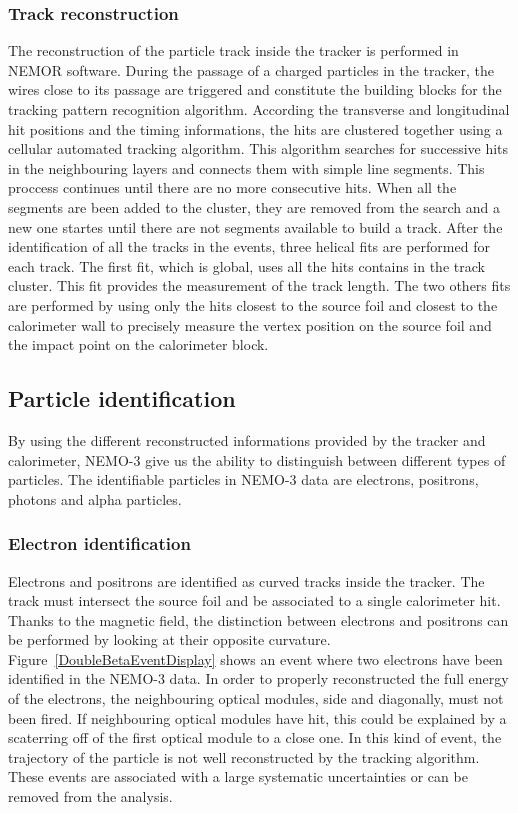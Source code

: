 \documentclass[main.tex]{subfiles}
\begin{document}
\subsubsection{Track reconstruction}


\NI The reconstruction of the particle track inside the tracker is performed in NEMOR software. During the passage of a charged particles in the tracker, the wires close to its passage are triggered and constitute the building blocks for the tracking pattern recognition algorithm. According the transverse and longitudinal hit positions and the timing informations, the hits are clustered together using a cellular automated tracking algorithm. This algorithm searches for successive hits in the neighbouring layers and connects them with simple line segments. This proccess continues until there are no more consecutive hits. When all the segments are been added to the cluster, they are removed from the search and a new one startes until there are not segments available to build a track. After the identification of all the tracks in the events, three helical fits are performed for each track. The first fit, which is global, uses all the hits contains in the track cluster. This fit provides the measurement of the track length. The two others fits are performed by using only the hits closest to the source foil and closest to the calorimeter wall to precisely measure the vertex position on the source foil and the impact point on the calorimeter block.


\subsection{Particle identification}\label{sec:PIDanalysis}


\NI By using the different reconstructed informations provided by the tracker and calorimeter, NEMO-3 give us the ability to distinguish between different types of particles. The identifiable particles in NEMO-3 data are electrons, positrons, photons and alpha particles.


\subsubsection{Electron identification}


\NI Electrons and positrons are identified as curved tracks inside the tracker. The track must intersect the source foil and be associated to a single calorimeter hit. Thanks to the magnetic field, the distinction between electrons and positrons can be performed by looking at their opposite curvature. Figure~\ref{DoubleBetaEventDisplay} shows an event where two electrons have been identified in the NEMO-3 data. In order to properly reconstructed the full energy of the electrons, the neighbouring optical modules, side and diagonally, must not been fired. If neighbouring optical modules have hit, this could be explained by a scaterring off of the first optical module to a close one. In this kind of event, the trajectory of the particle is not well reconstructed by the tracking algorithm. These events are associated with a large systematic uncertainties or can be removed from the analysis.
\end{document}
